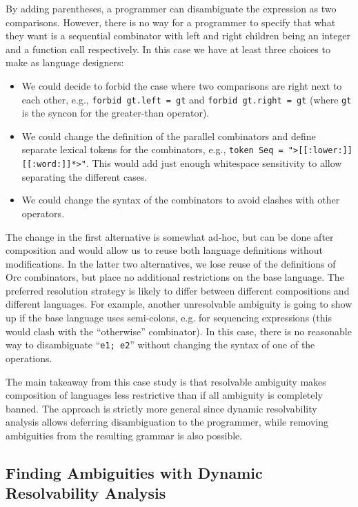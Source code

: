 \documentclass[acmsmall,review,anonymous]{acmart}\settopmatter{printfolios=true,printccs=false,printacmref=false}
\newcommand{\ocaml}{\lstinline[language={[objective]caml}]}
\newcommand{\syncon}{\lstinline[language=syncon]}
\begin{document}
\noindent
By adding parentheses, a programmer can disambiguate the
expression as two comparisons. However, there is no way for a
programmer to specify that what they want is a sequential
combinator with left and right children being an integer and a
function call respectively. In this case we have at least three
choices to make as language designers:

\begin{itemize}
\item We could decide to forbid the case where two comparisons are
  right next to each other, e.g., \syncon{forbid gt.left = gt} and
  \syncon{forbid gt.right = gt} (where \syncon{gt} is the syncon
  for the greater-than operator).
\item We could change the definition of the parallel combinators
  and define separate lexical tokens for the combinators, e.g.,
  \syncon{token Seq = ">[[:lower:]][[:word:]]*>"}. This would add
  just enough whitespace sensitivity to allow separating the
  different cases.
\item We could change the syntax of the combinators to avoid
  clashes with other operators.
\end{itemize}

\noindent
The change in the first alternative is somewhat ad-hoc, but can be done after composition
and would allow us to reuse both language definitions without
modifications. In the latter two alternatives, we lose reuse of
the definitions of Orc combinators, but place no additional
restrictions on the base language. The preferred resolution
strategy is likely to differ between different compositions and
different languages.
%
For example, another unresolvable ambiguity is going to show up if
the base language uses semi-colons, e.g. for sequencing
expressions (this would clash with the ``otherwise'' combinator).
In this case, there is no reasonable way to disambiguate
``\ocaml{e1; e2}'' without changing the syntax of one of the
operations.

The main takeaway from this case study is that resolvable
ambiguity makes composition of languages less restrictive than if
all ambiguity is completely banned. The approach is strictly more
general since dynamic resolvability analysis allows deferring
disambiguation to the programmer, while removing ambiguities from
the resulting grammar is also possible.


\subsection{Finding Ambiguities with Dynamic Resolvability Analysis} \label{sec:evaluation-ocaml}
\end{document}
